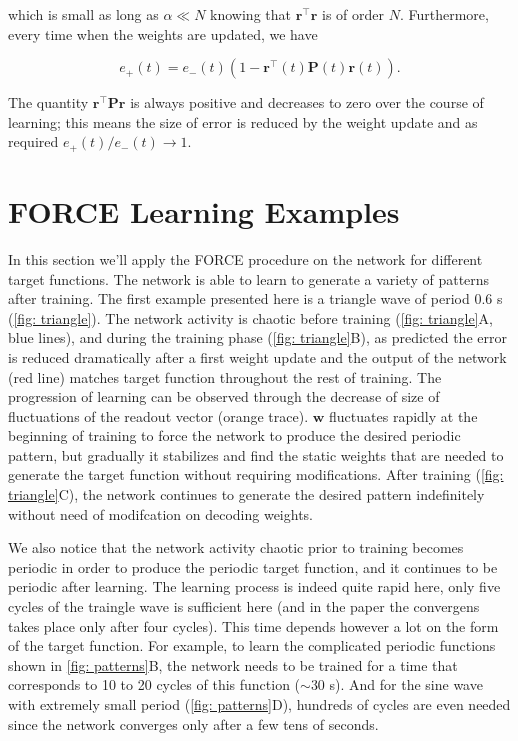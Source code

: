 \noindent
which is small as long as $\alpha \ll N$ knowing that 
$\mathbf{r}^{\top}\mathbf{r}$ is of order $N$. Furthermore, every time
when the weights are updated, we have

\[e_+(t) = e_-(t)(1-\mathbf{r}^{\top}(t)\mathbf{P}(t)\mathbf{r}(t)).\]

\noindent
The quantity $\mathbf{r}^{\top}\mathbf{Pr}$ is always positive and
decreases to zero over the course of learning; this means the size of 
error is reduced by the weight update and as required 
$e_+(t)/e_-(t) \rightarrow 1$.


\section{FORCE Learning Examples}

In this section we'll apply the FORCE procedure on the network for different
target functions. The network is able to learn to generate a variety of
patterns after training. The first example presented here is a 
triangle wave of period 0.6 s (\autoref{fig: triangle}). 
The network activity is chaotic before training 
(\autoref{fig: triangle}A, blue lines), and 
during the training phase (\autoref{fig: triangle}B), 
as predicted the error is reduced dramatically after a first weight
update and the output of the network (red line)
matches target function throughout
the rest of training. The progression of learning can be observed through
the decrease of size of fluctuations of the readout vector
(orange trace). $\mathbf{w}$ 
fluctuates rapidly at the beginning of training to force the network
to produce the desired periodic pattern, but gradually it stabilizes and
find the static weights that are needed to generate the target function
without requiring modifications. 
After training (\autoref{fig: triangle}C), the network continues
to generate the desired pattern indefinitely without need of modifcation 
on decoding weights.

We also notice that the network activity chaotic prior to training 
becomes periodic in order to produce the periodic target function, and
it continues to be periodic after learning. The learning process is indeed
quite rapid here, only five cycles of the traingle wave is sufficient 
here (and in the paper the convergens takes place only after four cycles).
This time depends however a lot on the form of the target function.
For example, to learn the complicated periodic functions shown in
\autoref{fig: patterns}B, the network needs to be trained for a time
that corresponds to 10 to 20 cycles of this function ($\sim 30$ s).
And for the sine wave with extremely small period (\autoref{fig: patterns}D),
hundreds of cycles are even needed since the network converges only
after a few tens of seconds.

